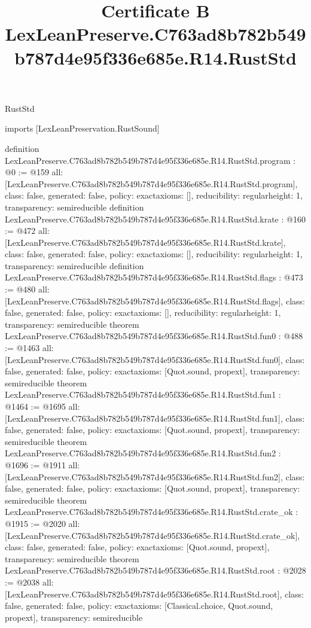 \begin{lexlean}{RustStd}
\title{Certificate B LexLeanPreserve.C763ad8b782b549b787d4e95f336e685e.R14.RustStd}
\begin{coremodule}
imports [LexLeanPreservation.RustSound]

definition LexLeanPreserve.C763ad8b782b549b787d4e95f336e685e.R14.RustStd.program : @0 := @159 {
  all: [LexLeanPreserve.C763ad8b782b549b787d4e95f336e685e.R14.RustStd.program],
  class: false,
  generated: false,
  policy: exact{axioms: []},
  reducibility: regular{height: 1},
  transparency: semireducible
}
definition LexLeanPreserve.C763ad8b782b549b787d4e95f336e685e.R14.RustStd.krate : @160 := @472 {
  all: [LexLeanPreserve.C763ad8b782b549b787d4e95f336e685e.R14.RustStd.krate],
  class: false,
  generated: false,
  policy: exact{axioms: []},
  reducibility: regular{height: 1},
  transparency: semireducible
}
definition LexLeanPreserve.C763ad8b782b549b787d4e95f336e685e.R14.RustStd.flags : @473 := @480 {
  all: [LexLeanPreserve.C763ad8b782b549b787d4e95f336e685e.R14.RustStd.flags],
  class: false,
  generated: false,
  policy: exact{axioms: []},
  reducibility: regular{height: 1},
  transparency: semireducible
}
theorem LexLeanPreserve.C763ad8b782b549b787d4e95f336e685e.R14.RustStd.fun0 : @488 := @1463 {
  all: [LexLeanPreserve.C763ad8b782b549b787d4e95f336e685e.R14.RustStd.fun0],
  class: false,
  generated: false,
  policy: exact{axioms: [Quot.sound, propext]},
  transparency: semireducible
}
theorem LexLeanPreserve.C763ad8b782b549b787d4e95f336e685e.R14.RustStd.fun1 : @1464 := @1695 {
  all: [LexLeanPreserve.C763ad8b782b549b787d4e95f336e685e.R14.RustStd.fun1],
  class: false,
  generated: false,
  policy: exact{axioms: [Quot.sound, propext]},
  transparency: semireducible
}
theorem LexLeanPreserve.C763ad8b782b549b787d4e95f336e685e.R14.RustStd.fun2 : @1696 := @1911 {
  all: [LexLeanPreserve.C763ad8b782b549b787d4e95f336e685e.R14.RustStd.fun2],
  class: false,
  generated: false,
  policy: exact{axioms: [Quot.sound, propext]},
  transparency: semireducible
}
theorem LexLeanPreserve.C763ad8b782b549b787d4e95f336e685e.R14.RustStd.crate_ok : @1915 := @2020 {
  all: [LexLeanPreserve.C763ad8b782b549b787d4e95f336e685e.R14.RustStd.crate_ok],
  class: false,
  generated: false,
  policy: exact{axioms: [Quot.sound, propext]},
  transparency: semireducible
}
theorem LexLeanPreserve.C763ad8b782b549b787d4e95f336e685e.R14.RustStd.root : @2028 := @2038 {
  all: [LexLeanPreserve.C763ad8b782b549b787d4e95f336e685e.R14.RustStd.root],
  class: false,
  generated: false,
  policy: exact{axioms: [Classical.choice, Quot.sound, propext]},
  transparency: semireducible
}


\end{coremodule}
\end{lexlean}
